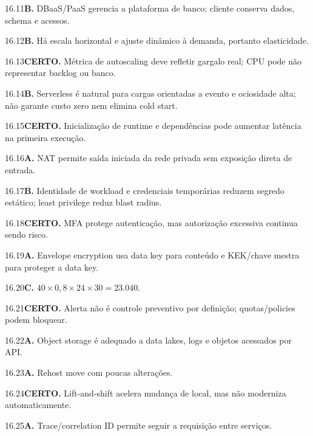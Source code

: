 \begin{solucao}{16.11}\textbf{B.} DBaaS/PaaS gerencia a plataforma de banco; cliente conserva dados, schema e acessos.\end{solucao}
\begin{solucao}{16.12}\textbf{B.} Há escala horizontal e ajuste dinâmico à demanda, portanto elasticidade.\end{solucao}
\begin{solucao}{16.13}\textbf{CERTO.} Métrica de autoscaling deve refletir gargalo real; CPU pode não representar backlog ou banco.\end{solucao}
\begin{solucao}{16.14}\textbf{B.} Serverless é natural para cargas orientadas a evento e ociosidade alta; não garante custo zero nem elimina cold start.\end{solucao}
\begin{solucao}{16.15}\textbf{CERTO.} Inicialização de runtime e dependências pode aumentar latência na primeira execução.\end{solucao}
\begin{solucao}{16.16}\textbf{A.} NAT permite saída iniciada da rede privada sem exposição direta de entrada.\end{solucao}
\begin{solucao}{16.17}\textbf{B.} Identidade de workload e credenciais temporárias reduzem segredo estático; least privilege reduz blast radius.\end{solucao}
\begin{solucao}{16.18}\textbf{CERTO.} MFA protege autenticação, mas autorização excessiva continua sendo risco.\end{solucao}
\begin{solucao}{16.19}\textbf{A.} Envelope encryption usa data key para conteúdo e KEK/chave mestra para proteger a data key.\end{solucao}
\begin{solucao}{16.20}\textbf{C.} $40\times0,8\times24\times30=23.040$.\end{solucao}
\begin{solucao}{16.21}\textbf{CERTO.} Alerta não é controle preventivo por definição; quotas/policies podem bloquear.\end{solucao}
\begin{solucao}{16.22}\textbf{A.} Object storage é adequado a data lakes, logs e objetos acessados por API.\end{solucao}
\begin{solucao}{16.23}\textbf{A.} Rehost move com poucas alterações.\end{solucao}
\begin{solucao}{16.24}\textbf{CERTO.} Lift-and-shift acelera mudança de local, mas não moderniza automaticamente.\end{solucao}
\begin{solucao}{16.25}\textbf{A.} Trace/correlation ID permite seguir a requisição entre serviços.\end{solucao}

